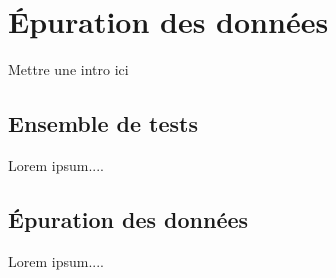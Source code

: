 \section{Épuration des données}
Mettre une intro ici
\subsection{Ensemble de tests}
Lorem ipsum....
\subsection{Épuration des données}
Lorem ipsum....
